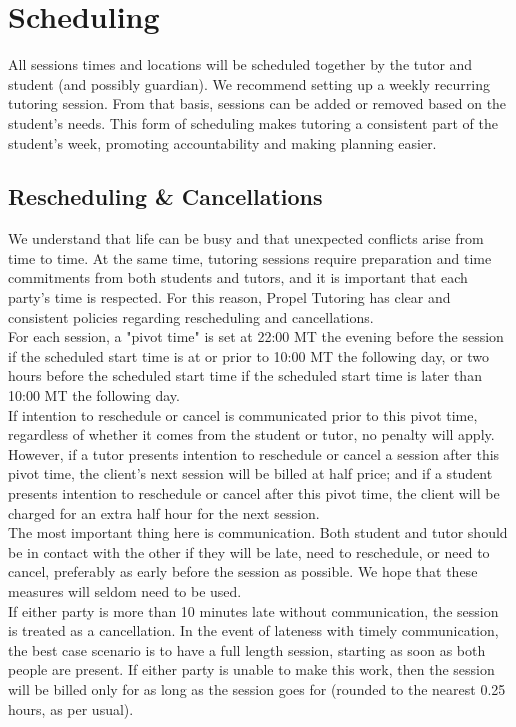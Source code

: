 \documentclass{article}
\begin{document}

\section{Scheduling}
All sessions times and locations will be scheduled together by the tutor and student (and possibly guardian). We recommend setting up a weekly recurring tutoring session. From that basis, sessions can be added or removed based on the student's needs. This form of scheduling makes tutoring a consistent part of the student's week, promoting accountability and making planning easier.

\subsection{Rescheduling \& Cancellations}
We understand that life can be busy and that unexpected conflicts arise from time to time. At the same time, tutoring sessions require preparation and time commitments from both students and tutors, and it is important that each party’s time is respected. For this reason, Propel Tutoring has clear and consistent policies regarding rescheduling and cancellations.\\

For each session, a "pivot time" is set at 22:00 MT the evening before the session if the scheduled start time is at or prior to 10:00 MT the following day, or two hours before the scheduled start time if the scheduled start time is later than 10:00 MT the following day.\\

If intention to reschedule or cancel is communicated prior to this pivot time, regardless of whether it comes from the student or tutor, no penalty will apply. However, if a tutor presents intention to reschedule or cancel a session after this pivot time, the client’s next session will be billed at half price; and if a student presents intention to reschedule or cancel after this pivot time, the client will be charged for an extra half hour for the next session.\\

The most important thing here is communication. Both student and tutor should be in contact with the other if they will be late, need to reschedule, or need to cancel, preferably as early before the session as possible. We hope that these measures will seldom need to be used.\\

If either party is more than 10 minutes late without communication, the session is treated as a cancellation. In the event of lateness with timely communication, the best case scenario is to have a full length session, starting as soon as both people are present. If either party is unable to make this work, then the session will be billed only for as long as the session goes for (rounded to the nearest 0.25 hours, as per usual).\\
\end{document}
